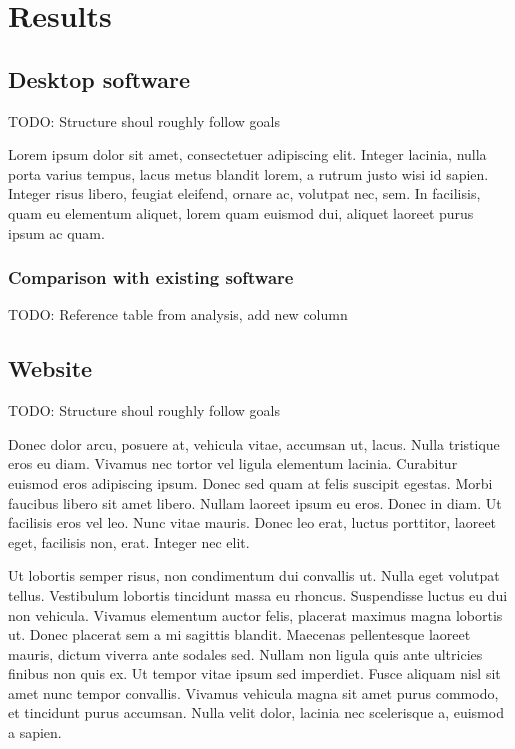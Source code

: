 \documentclass[thesismargins, english, thesislinespacing, twoside, openright, upjsfrontpage]{rnthesis}
\begin{document}
\chapter{Results}

\section{Desktop software}

TODO: Structure shoul roughly follow goals

Lorem ipsum dolor sit amet, consectetuer adipiscing elit.
Integer lacinia, nulla porta varius tempus, lacus metus blandit
lorem, a rutrum justo wisi id sapien. Integer risus libero,
feugiat eleifend, ornare ac, volutpat nec, sem. In facilisis,
quam eu elementum aliquet, lorem quam euismod dui, aliquet
laoreet purus ipsum ac quam.

\subsection{Comparison with existing software}

TODO: Reference table from analysis, add new column

\section{Website}

TODO: Structure shoul roughly follow goals

Donec dolor arcu, posuere at, vehicula vitae, accumsan ut,
lacus. Nulla tristique eros eu diam. Vivamus nec tortor vel
ligula elementum lacinia. Curabitur euismod eros adipiscing
ipsum. Donec sed quam at felis suscipit egestas. Morbi faucibus
libero sit amet libero. Nullam laoreet ipsum eu eros. Donec in
diam. Ut facilisis eros vel leo. Nunc vitae mauris. Donec leo
erat, luctus porttitor, laoreet eget, facilisis non, erat.
Integer nec elit.

\zaver

Ut lobortis semper risus, non condimentum dui convallis ut. Nulla eget volutpat tellus. Vestibulum lobortis tincidunt massa eu rhoncus. Suspendisse luctus eu dui non vehicula. Vivamus elementum auctor felis, placerat maximus magna lobortis ut. Donec placerat sem a mi sagittis blandit. Maecenas pellentesque laoreet mauris, dictum viverra ante sodales sed. Nullam non ligula quis ante ultricies finibus non quis ex. Ut tempor vitae ipsum sed imperdiet. Fusce aliquam nisl sit amet nunc tempor convallis. Vivamus vehicula magna sit amet purus commodo, et tincidunt purus accumsan. Nulla velit dolor, lacinia nec scelerisque a, euismod a sapien.
%
\end{document}
